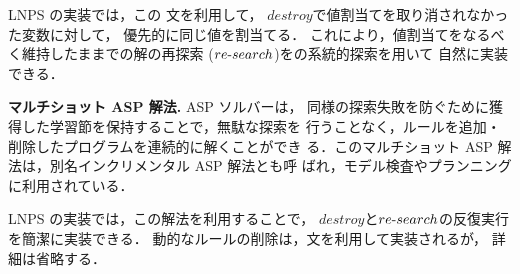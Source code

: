 LNPS の実装では，この 文を利用して，
$destroy$で値割当てを取り消されなかった変数に対して，
優先的に同じ値を割当てる．
これにより，値割当てをなるべく維持したままでの解の再探索
($re\mathchar`-search$)を{\clingo}の系統的探索を用いて
自然に実装できる．

\textbf{マルチショット ASP 解法.}
ASP ソルバー{\clingo}は，
同様の探索失敗を防ぐために獲得した学習節を保持することで，無駄な探索を
行うことなく，ルールを追加・削除したプログラムを連続的に解くことができ
る．このマルチショット ASP 解法は，別名インクリメンタル ASP 解法とも呼
ばれ，モデル検査やプランニングに利用されている．

LNPS の実装では，この解法を利用することで，
$destroy$と$re\mathchar`-search$の反復実行を簡潔に実装できる．
動的なルールの削除は，文を利用して実装されるが，
詳細は省略する．

